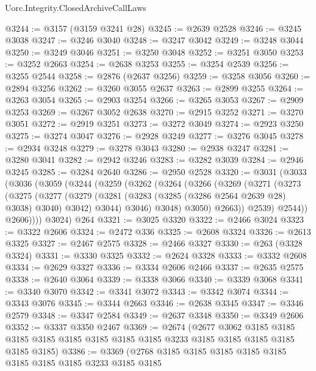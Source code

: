 \begin{lexlean}{Uorc.Integrity.ClosedArchiveCallLaws}
\begin{coremodule}
@3244 := @3157 (@3159 @3241 @28)
@3245 := @2639 @2528
@3246 := @3245 @3038
@3247 := @3246 @3040
@3248 := @3247 @3042
@3249 := @3248 @3044
@3250 := @3249 @3046
@3251 := @3250 @3048
@3252 := @3251 @3050
@3253 := @3252 @2663
@3254 := @2638 @3253
@3255 := @3254 @2539
@3256 := @3255 @2544
@3258 := @2876 (@2637 @3256)
@3259 := @3258 @3056
@3260 := @2894 @3256
@3262 := @3260 @3055 @2637
@3263 := @2899 @3255
@3264 := @3263 @3054
@3265 := @2903 @3254
@3266 := @3265 @3053
@3267 := @2909 @3253
@3269 := @3267 @3052 @2638
@3270 := @2915 @3252
@3271 := @3270 @3051
@3272 := @2919 @3251
@3273 := @3272 @3049
@3274 := @2923 @3250
@3275 := @3274 @3047
@3276 := @2928 @3249
@3277 := @3276 @3045
@3278 := @2934 @3248
@3279 := @3278 @3043
@3280 := @2938 @3247
@3281 := @3280 @3041
@3282 := @2942 @3246
@3283 := @3282 @3039
@3284 := @2946 @3245
@3285 := @3284 @2640
@3286 := @2950 @2528
@3320 := @3031
    (@3033
      (@3036
        (@3059
          (@3244
            (@3259
              (@3262
                (@3264
                  (@3266
                    (@3269
                      (@3271
                        (@3273
                          (@3275
                            (@3277
                              (@3279
                                (@3281 (@3283 (@3285 (@3286 @2564 @2639 @28) @3038) @3040) @3042)
                                @3044)
                              @3046)
                            @3048)
                          @3050)
                        @2663))
                    @2539)
                  @2544))
              @2606))))
      @3024)
    @264
@3321 := @3025 @3320
@3322 := @2466 @3024
@3323 := @3322 @2606
@3324 := @2472 @336
@3325 := @2608 @3324
@3326 := @2613 @3325
@3327 := @2467 @2575
@3328 := @2466 @3327
@3330 := @263 (@3328 @3324)
@3331 := @3330 @3325
@3332 := @2624 @3328
@3333 := @3332 @2608
@3334 := @2629 @3327
@3336 := @3334 @2606 @2466
@3337 := @2635 @2575
@3338 := @2640 @3064
@3339 := @3338 @3066
@3340 := @3339 @3068
@3341 := @3340 @3070
@3342 := @3341 @3072
@3343 := @3342 @3074
@3344 := @3343 @3076
@3345 := @3344 @2663
@3346 := @2638 @3345
@3347 := @3346 @2579
@3348 := @3347 @2584
@3349 := @2637 @3348
@3350 := @3349 @2606
@3352 := @3337 @3350 @2467
@3369 := @2674
    (@2677
      @3062
      @3185
      @3185
      @3185
      @3185
      @3185
      @3185
      @3185
      @3185
      @3233
      @3185
      @3185
      @3185
      @3185
      @3185
      @3185)
@3386 := @3369
    (@2768
      @3185
      @3185
      @3185
      @3185
      @3185
      @3185
      @3185
      @3185
      @3233
      @3185
      @3185

\end{coremodule}
\end{lexlean}
